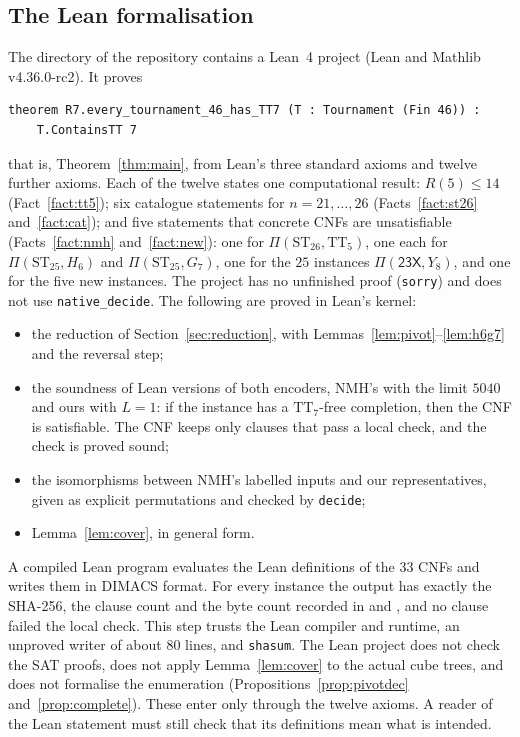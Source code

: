 \documentclass[11pt]{amsart}
\theoremstyle{definition}
\theoremstyle{remark}
\newcommand{\TT}[1]{\mathrm{TT}_{#1}}
\newcommand{\ST}[1]{\mathrm{ST}_{#1}}
\newcommand{\cl}[1]{\textsf{#1}}
\newcommand{\Piv}[2]{\Pi(#1,#2)}
\begin{document}
\subsection{The Lean formalisation}\label{sec:lean}
The directory  of the repository contains a Lean~4 project
(Lean and Mathlib v4.36.0-rc2). It proves
{\small
\begin{verbatim}
theorem R7.every_tournament_46_has_TT7 (T : Tournament (Fin 46)) :
    T.ContainsTT 7
\end{verbatim}}
\noindent that is, Theorem~\ref{thm:main}, from Lean's three standard axioms and
twelve further axioms. Each of the twelve states one computational result:
$R(5) \le 14$ (Fact~\ref{fact:tt5}); six catalogue statements for
$n=21,\dots,26$ (Facts~\ref{fact:st26} and~\ref{fact:cat}); and five
statements that concrete CNFs are unsatisfiable (Facts~\ref{fact:nmh}
and~\ref{fact:new}): one for $\Piv{\ST{26}}{\TT{5}}$, one each for
$\Piv{\ST{25}}{H_6}$ and $\Piv{\ST{25}}{G_7}$, one for the $25$ instances
$\Piv{\cl{23X}}{Y_8}$, and one for the five new instances. The project has no
unfinished proof (\texttt{sorry}) and does not use \texttt{native\_decide}. The
following are proved in Lean's kernel:
\begin{itemize}
\item the reduction of Section~\ref{sec:reduction}, with
  Lemmas~\ref{lem:pivot}--\ref{lem:h6g7} and the reversal step;
\item the soundness of Lean versions of both encoders, NMH's with the limit
  $5040$ and ours with $L=1$: if the instance has a $\TT{7}$-free completion,
  then the CNF is satisfiable. The CNF keeps only clauses that pass a local
  check, and the check is proved sound;
\item the isomorphisms between NMH's labelled inputs and our representatives,
  given as explicit permutations and checked by \texttt{decide};
\item Lemma~\ref{lem:cover}, in general form.
\end{itemize}
A compiled Lean program evaluates the Lean definitions of the $33$ CNFs and
writes them in DIMACS format. For every instance the output has exactly the
SHA-256, the clause count and the byte count recorded in
 and , and no
clause failed the local check. This step trusts the Lean compiler and runtime,
an unproved writer of about $80$ lines, and \texttt{shasum}. The Lean project
does not check the SAT proofs, does not apply Lemma~\ref{lem:cover} to the
actual cube trees, and does not formalise the enumeration
(Propositions~\ref{prop:pivotdec} and~\ref{prop:complete}). These enter only
through the twelve axioms. A reader of the Lean statement must still check
that its definitions mean what is intended.
\end{document}

